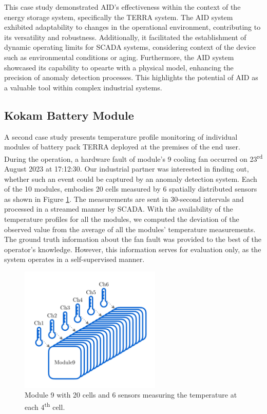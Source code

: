 This case study demonstrated AID's effectiveness  within the context of the energy storage system, specifically the TERRA system. The AID system exhibited adaptability to changes in the operational environment, contributing to its versatility and robustness. Additionally, it facilitated the establishment of dynamic operating limits for SCADA systems, considering context of the device such as environmental conditions or aging. Furthermore, the AID system showcased its capability to opearte with a physical model, enhancing the precision of anomaly detection processes. This highlights the potential of AID as a valuable tool within complex industrial systems.

\subsection{Kokam Battery Module}\label{AA:Kokam}
A second case study presents temperature profile monitoring of individual modules of battery pack TERRA deployed at the premises of the end user. During the operation, a hardware fault of module's 9 cooling fan occurred on 23\textsuperscript{rd} August 2023 at 17:12:30. Our industrial partner was interested in finding out, whether such an event could be captured by an anomaly detection system. Each of the 10 modules, embodies 20 cells measured by 6 spatially distributed sensors as shown in Figure \ref{fig:kokam_module}. The measurements are sent in 30-second intervals and processed in a streamed manner by SCADA. With the availability of the temperature profiles for all the modules, we computed the deviation of the observed value from the average of all the modules' temperature measurements. The ground truth information about the fan fault was provided to the best of the operator's knowledge. However, this information serves for evaluation only, as the system operates in a self-supervised manner.

\begin{figure}[htbp]
\centering
 \includegraphics[width=0.6\textwidth]{figures/Kokam_module9_measure points.pdf}
 \caption{Module 9 with 20 cells and 6 sensors measuring the temperature at each 4\textsuperscript{th} cell.}
 \label{fig:kokam_module}
\end{figure}

